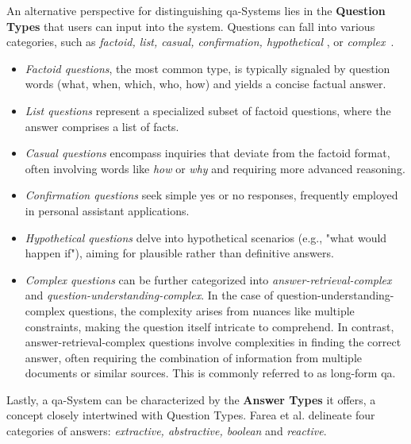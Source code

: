 An alternative perspective for distinguishing \gls{qa}-Systems lies in the \textbf{Question Types} that users can input into the system. Questions can fall into various categories, such as \textit{factoid, list, casual, confirmation, hypothetical} \cite{mishra_survey_2016}, or \textit{complex}~\cite{etezadi_state_2023}.\nopagebreak

\begin{itemize}
   \item \textit{Factoid questions}, the most common type, is typically signaled by question words (what, when, which, who, how) and yields a concise factual answer.
   
   \item \textit{List questions} represent a specialized subset of factoid questions, where the answer comprises a list of facts.
   
   \item \textit{Casual questions} encompass inquiries that deviate from the factoid format, often involving words like \textit{how} or \textit{why} and requiring more advanced reasoning.
   
   \item \textit{Confirmation questions} seek simple yes or no responses, frequently employed in personal assistant applications.
   
   \item \textit{Hypothetical questions} delve into hypothetical scenarios (e.g., "what would happen if"), aiming for plausible rather than definitive answers.
   
   \item \textit{Complex questions} can be further categorized into \textit{answer-retrieval-complex} and \textit{question-understanding-complex}. In the case of question-understanding-complex questions, the complexity arises from nuances like multiple constraints, making the question itself intricate to comprehend. In contrast, answer-retrieval-complex questions involve complexities in finding the correct answer, often requiring the combination of information from multiple documents or similar sources. This is commonly referred to as long-form \gls{qa}.
\end{itemize}

Lastly, a \gls{qa}-System can be characterized by the \textbf{Answer Types} it offers, a concept closely intertwined with Question Types. Farea et al. \cite{farea_evaluation_2022} delineate four categories of answers: \textit{extractive, abstractive, boolean} and \textit{reactive}. 

